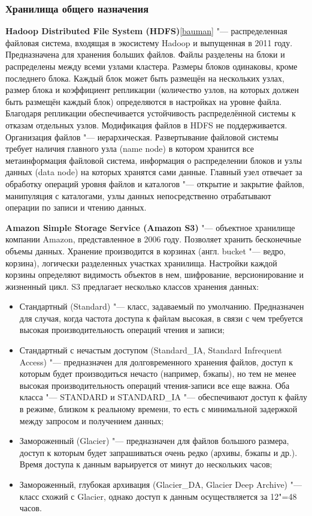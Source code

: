 \documentclass[bachelor, och, pract]{SCWorks}
\begin{document}
\subsubsection{Хранилища общего назначения}
\textbf{Hadoop Distributed File System (HDFS)}\ref{bauman} "--- распределенная файловая система, входящая в экосистему Hadoop и выпущенная в 2011 году. Предназначена для хранения больших файлов. Файлы разделены на блоки и распределены между всеми узлами кластера. Размеры блоков одинаковы, кроме последнего блока. Каждый блок может быть размещён на нескольких узлах, размер блока и коэффициент репликации (количество узлов, на которых должен быть размещён каждый блок) определяются в настройках на уровне файла. Благодаря репликации обеспечивается устойчивость распределённой системы к отказам отдельных узлов. Модификация файлов в HDFS не поддерживается. Организация файлов "--- иерархическая. Развертывание файловой системы требует наличия главного узла (name node) в котором хранится все метаинформация файловой система, информация о распределении блоков и узлы данных (data node) на которых хранятся сами данные. Главный узел отвечает за обработку операций уровня файлов и каталогов "--- открытие и закрытие файлов, манипуляция с каталогами, узлы данных непосредственно отрабатывают операции по записи и чтению данных.

\textbf{Amazon Simple Storage Service (Amazon S3)} "--- объектное хранилище компании Amazon, представленное в 2006 году. Позволяет хранить бесконечные объемы данных. Хранение производится в корзинах (англ. bucket "--- ведро, корзина), логически разделенных участках хранилища. Настройки каждой корзины определяют видимость объектов в нем, шифрование, версионирование и жизненный цикл. S3 предлагает несколько классов хранения данных:
\begin{itemize}
	\item Стандартный (Standard) "--- класс, задаваемый по умолчанию. Предназначен для случая, когда частота доступа к файлам высокая, в связи с чем требуется высокая производительность операций чтения и записи;
	\item Стандартный с нечастым доступом (Standard\_IA, Standard Infrequent Access) "--- предназначен для долговременного хранения файлов, доступ к которым будет производиться нечасто (например, бэкапы), но тем не менее высокая производительность операций чтения-записи все еще важна. Оба класса "--- STANDARD и STANDARD\_IA "--- обеспечивают доступ к файлу в режиме, близком к реальному времени, то есть с минимальной задержкой между запросом и получением данных;
	\item Замороженный (Glacier) "--- предназначен для файлов большого размера, доступ к которым будет запрашиваться очень редко (архивы, бэкапы и др.). Время доступа к данным варьируется от минут до нескольких часов;
	\item Замороженный, глубокая архивация (Glacier\_DA, Glacier Deep Archive) "--- класс схожий с Glacier, однако доступ к данным осуществляется за 12"=48 часов.
\end{itemize}
\end{document}
